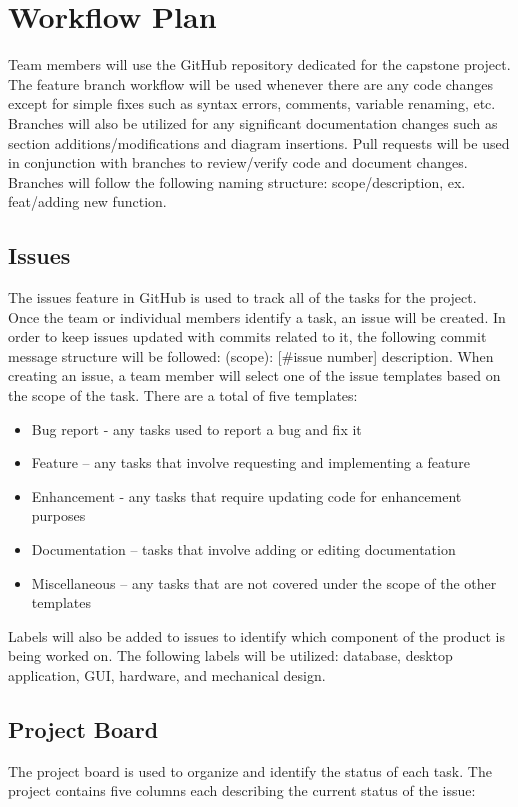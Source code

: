 \documentclass{article}
\begin{document}
\section{Workflow Plan}
Team members will use the GitHub repository dedicated for the capstone project. The feature
branch workflow will be used whenever there are any code changes except for simple fixes such as syntax errors, comments, variable renaming, etc. 
Branches will also be utilized for any significant documentation changes such as section additions/modifications and diagram insertions. 
Pull requests will be used in conjunction with branches to review/verify code and document changes.
Branches will follow the following naming structure: scope/description, ex. feat/adding new function.

\subsection{Issues}
The issues feature in GitHub is used to track all of the tasks for the project. Once the team or individual members identify a task, an issue will be created. In order to keep issues updated with commits related to it, the following commit message structure will be followed: (scope): [\#issue number] description. When creating an issue, a team member will select one of the issue templates based on the scope of the task. There are a total of five templates: 

\begin{itemize}
	\item Bug report - any tasks used to report a bug and fix it
	\item Feature – any tasks that involve requesting and implementing a feature
	\item Enhancement - any tasks that require updating code for enhancement purposes
	\item Documentation – tasks that involve adding or editing documentation
	\item Miscellaneous – any tasks that are not covered under the scope of the other templates
\end{itemize}

\noindent
Labels will also be added to issues to identify which component of the
product is being worked on. The following labels will be utilized: 
database, desktop application, GUI, hardware, and mechanical design.

\subsection{Project Board}
The project board is used to organize and identify the status of each task. 
The project contains five columns each describing the current status of the issue:
\end{document}
